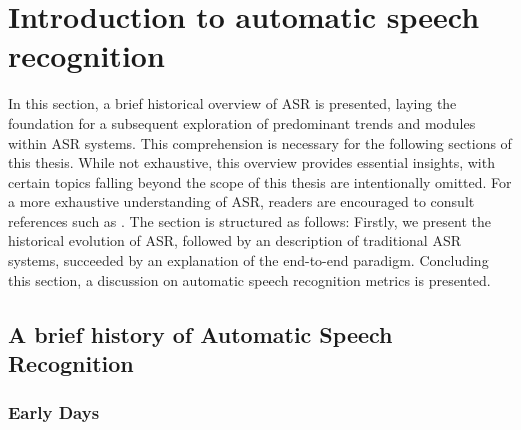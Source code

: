 \newpage
\section{Introduction to automatic speech recognition}%
In this section, a brief historical overview of ASR is presented, laying the foundation for a subsequent exploration of predominant trends and modules within ASR systems. This comprehension is necessary for the following sections of this thesis. While not exhaustive, this overview provides essential insights, with certain topics falling beyond the scope of this thesis are intentionally omitted. For a more exhaustive understanding of ASR, readers are encouraged to consult references such as \cite{benzeghiba2007automatic, karpagavalli2016review, arora2012automatic}. The section is structured as follows: Firstly, we present the historical evolution of ASR, followed by an description of traditional ASR systems, succeeded by an explanation of the end-to-end paradigm. Concluding this section, a discussion on automatic speech recognition metrics is presented.

\subsection{A brief history of Automatic Speech Recognition}

\subsubsection{Early Days}


